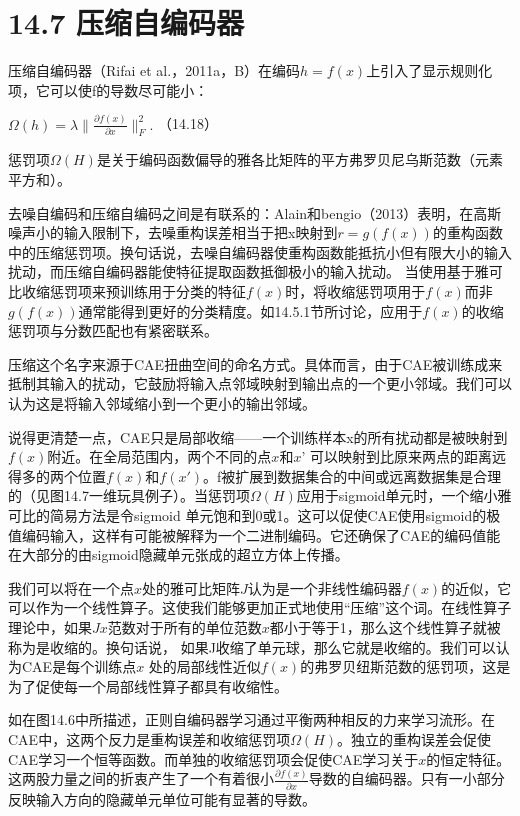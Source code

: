 \documentclass[a4paper,11pt]{book}
\begin{document}
\frontmatter
\section{14.7 压缩自编码器}
压缩自编码器（Rifai et al.，2011a，B）在编码$h=f(x)$上引入了显示规则化项，它可以使f的导数尽可能小：

\begin{math}
 \Omega(h) = \lambda \Bigg\| \frac{\partial f(x)}{\partial x} \Bigg\|_F^2 .
\end{math}
（14.18）

惩罚项$\Omega(H)$是关于编码函数偏导的雅各比矩阵的平方弗罗贝尼乌斯范数（元素平方和）。

去噪自编码和压缩自编码之间是有联系的：Alain和bengio（2013）表明，在高斯噪声小的输入限制下，去噪重构误差相当于把x映射到$r=g(f(x))$的重构函数中的压缩惩罚项。换句话说，去噪自编码器使重构函数能抵抗小但有限大小的输入扰动，而压缩自编码器能使特征提取函数抵御极小的输入扰动。 当使用基于雅可比收缩惩罚项来预训练用于分类的特征$f(x)$时，将收缩惩罚项用于$f(x)$而非$g(f(x))$通常能得到更好的分类精度。如14.5.1节所讨论，应用于$f(x)$的收缩惩罚项与分数匹配也有紧密联系。

压缩这个名字来源于CAE扭曲空间的命名方式。具体而言，由于CAE被训练成来抵制其输入的扰动，它鼓励将输入点邻域映射到输出点的一个更小邻域。我们可以认为这是将输入邻域缩小到一个更小的输出邻域。

说得更清楚一点，CAE只是局部收缩——一个训练样本x的所有扰动都是被映射到$f(x)$附近。在全局范围内，两个不同的点$x$和$x’$ 可以映射到比原来两点的距离远得多的两个位置$f(x)$和$f(x')$。f被扩展到数据集合的中间或远离数据集是合理的（见图14.7一维玩具例子）。当惩罚项$\Omega(H)$应用于sigmoid单元时，一个缩小雅可比的简易方法是令sigmoid 单元饱和到0或1。这可以促使CAE使用sigmoid的极值编码输入，这样有可能被解释为一个二进制编码。它还确保了CAE的编码值能在大部分的由sigmoid隐藏单元张成的超立方体上传播。

我们可以将在一个点$x$处的雅可比矩阵$J$认为是一个非线性编码器$f(x)$的近似，它可以作为一个线性算子。这使我们能够更加正式地使用“压缩”这个词。在线性算子理论中，如果$Jx$范数对于所有的单位范数$x$都小于等于1，那么这个线性算子就被称为是收缩的。换句话说， 如果J收缩了单元球，那么它就是收缩的。我们可以认为CAE是每个训练点$x$ 处的局部线性近似$f(x)$的弗罗贝纽斯范数的惩罚项，这是为了促使每一个局部线性算子都具有收缩性。

如在图14.6中所描述，正则自编码器学习通过平衡两种相反的力来学习流形。在CAE中，这两个反力是重构误差和收缩惩罚项$\Omega(H)$。独立的重构误差会促使CAE学习一个恒等函数。而单独的收缩惩罚项会促使CAE学习关于$x$的恒定特征。这两股力量之间的折衷产生了一个有着很小$\frac{\partial f(x)}{\partial x}$导数的自编码器。只有一小部分反映输入方向的隐藏单元单位可能有显著的导数。
\end{document}
